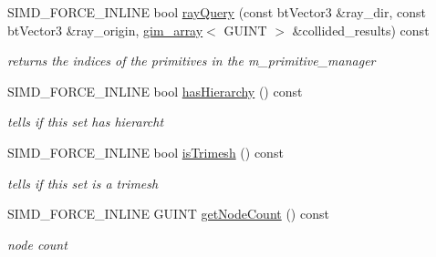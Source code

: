 \begin{DoxyCompactItemize}
\mbox{\label{classGIM__BOX__TREE__TEMPLATE__SET_ad5eeb69c9aa08a8162b69d6e4531330d}} 
S\+I\+M\+D\+\_\+\+F\+O\+R\+C\+E\+\_\+\+I\+N\+L\+I\+NE bool \hyperlink{classGIM__BOX__TREE__TEMPLATE__SET_ad5eeb69c9aa08a8162b69d6e4531330d}{ray\+Query} (const bt\+Vector3 \&ray\+\_\+dir, const bt\+Vector3 \&ray\+\_\+origin, \hyperlink{classgim__array}{gim\+\_\+array}$<$ G\+U\+I\+NT $>$ \&collided\+\_\+results) const
\begin{DoxyCompactList}\small\item\em returns the indices of the primitives in the m\+\_\+primitive\+\_\+manager \end{DoxyCompactList}\item 
\mbox{\label{classGIM__BOX__TREE__TEMPLATE__SET_a24686e0ae5cdde9e7e5eb8bce74e597e}} 
S\+I\+M\+D\+\_\+\+F\+O\+R\+C\+E\+\_\+\+I\+N\+L\+I\+NE bool \hyperlink{classGIM__BOX__TREE__TEMPLATE__SET_a24686e0ae5cdde9e7e5eb8bce74e597e}{has\+Hierarchy} () const
\begin{DoxyCompactList}\small\item\em tells if this set has hierarcht \end{DoxyCompactList}\item 
\mbox{\label{classGIM__BOX__TREE__TEMPLATE__SET_a58be3bd10ea7c89c369084cbba655bbc}} 
S\+I\+M\+D\+\_\+\+F\+O\+R\+C\+E\+\_\+\+I\+N\+L\+I\+NE bool \hyperlink{classGIM__BOX__TREE__TEMPLATE__SET_a58be3bd10ea7c89c369084cbba655bbc}{is\+Trimesh} () const
\begin{DoxyCompactList}\small\item\em tells if this set is a trimesh \end{DoxyCompactList}\item 
\mbox{\label{classGIM__BOX__TREE__TEMPLATE__SET_a3c7ceb8815be89e7b54c3f0bdd0ff571}} 
S\+I\+M\+D\+\_\+\+F\+O\+R\+C\+E\+\_\+\+I\+N\+L\+I\+NE G\+U\+I\+NT \hyperlink{classGIM__BOX__TREE__TEMPLATE__SET_a3c7ceb8815be89e7b54c3f0bdd0ff571}{get\+Node\+Count} () const
\begin{DoxyCompactList}\small\item\em node count \end{DoxyCompactList}\item 
\mbox{\label{classGIM__BOX__TREE__TEMPLATE__SET_a2388f9b52409031c7c1eb8144466ccda}} 

\end{DoxyCompactItemize}
